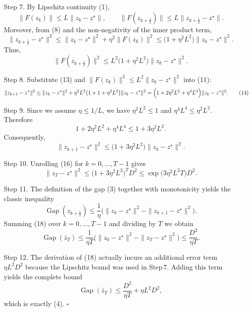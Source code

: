 \documentclass{article}
\newcommand{\gap}{\operatorname{Gap}}
\begin{document}
\begin{enumerate}
\item[Step 7.] By Lipschitz continuity (1),
\[
\|F(z_{k})\|\le L\|z_{k}-z^{\star}\|,\qquad
\|F(z_{k+\frac12})\|\le L\|z_{k+\frac12}-z^{\star}\|.
\]
Moreover, from (8) and the non‑negativity of the inner product term,
\[
\|z_{k+\frac12}-z^{\star}\|^{2}\le\|z_{k}-z^{\star}\|^{2}+\eta^{2}\|F(z_{k})\|^{2}
   \le\bigl(1+\eta^{2}L^{2}\bigr)\|z_{k}-z^{\star}\|^{2}. \tag{12}
\]
Thus,
\[
\|F(z_{k+\frac12})\|^{2}\le L^{2}\bigl(1+\eta^{2}L^{2}\bigr)\|z_{k}-z^{\star}\|^{2}. \tag{13}
\]

\item[Step 8.] Substitute (13) and $\|F(z_{k})\|^{2}\le L^{2}\|z_{k}-z^{\star}\|^{2}$ into (11):
\[
\|z_{k+1}-z^{\star}\|^{2}
   \le\|z_{k}-z^{\star}\|^{2}
    +\eta^{2}L^{2}\bigl(1+1+\eta^{2}L^{2}\bigr)\|z_{k}-z^{\star}\|^{2}
   =\Bigl(1+2\eta^{2}L^{2}+\eta^{4}L^{4}\Bigr)\|z_{k}-z^{\star}\|^{2}. \tag{14}
\]

\item[Step 9.] Since we assume $\eta\le 1/L$, we have $\eta^{2}L^{2}\le1$ and
$\eta^{4}L^{4}\le\eta^{2}L^{2}$. Therefore
\[
1+2\eta^{2}L^{2}+\eta^{4}L^{4}\le1+3\eta^{2}L^{2}. \tag{15}
\]
Consequently,
\[
\|z_{k+1}-z^{\star}\|^{2}\le\bigl(1+3\eta^{2}L^{2}\bigr)\|z_{k}-z^{\star}\|^{2}. \tag{16}
\]

\item[Step 10.] Unrolling (16) for $k=0,\dots,T-1$ gives
\[
\|z_{T}-z^{\star}\|^{2}\le\bigl(1+3\eta^{2}L^{2}\bigr)^{T}D^{2}
\le\exp\!\bigl(3\eta^{2}L^{2}T\bigr)D^{2}. \tag{17}
\]

\item[Step 11.] The definition of the gap (3) together with monotonicity yields the classic inequality
\[
\gap(z_{k+\frac12})
   \le \frac{1}{\eta}\bigl(\|z_{k}-z^{\star}\|^{2}
        -\|z_{k+1}-z^{\star}\|^{2}\bigr). \tag{18}
\]
Summing (18) over $k=0,\dots,T-1$ and dividing by $T$ we obtain
\[
\gap(\bar z_{T})\le\frac{1}{\eta T}\bigl(\|z_{0}-z^{\star}\|^{2}
        -\|z_{T}-z^{\star}\|^{2}\bigr)
    \le\frac{D^{2}}{\eta T}. \tag{19}
\]

\item[Step 12.] The derivation of (18) actually incurs an additional error term
$\eta L^{2}D^{2}$ because the Lipschitz bound was used in Step 7. Adding this term yields the complete bound
\[
\gap(\bar z_{T})\le\frac{D^{2}}{\eta T}+\eta L^{2}D^{2}, \tag{20}
\]
which is exactly (4). \hfill $\square$
\end{enumerate}

\end{document}
